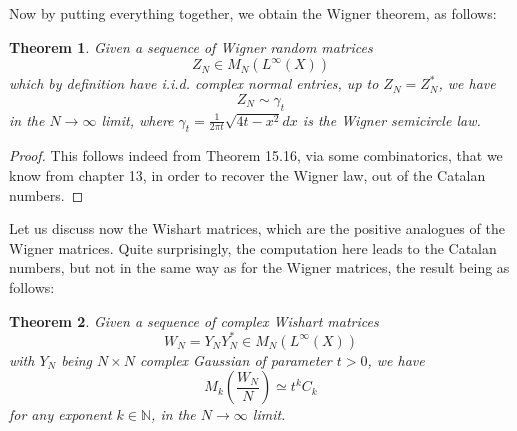 \documentclass[12pt]{amsbook}
\newtheorem{theorem}{Theorem}[chapter]
\begin{document}
Now by putting everything together, we obtain the Wigner theorem, as follows:

\begin{theorem}
Given a sequence of Wigner random matrices
$$Z_N\in M_N(L^\infty(X))$$
which by definition have i.i.d. complex normal entries, up to $Z_N=Z_N^*$, we have
$$Z_N\sim\gamma_t$$
in the $N\to\infty$ limit, where $\gamma_t=\frac{1}{2\pi t}\sqrt{4t-x^2}dx$ is the Wigner semicircle law. 
\end{theorem}

\begin{proof}
This follows indeed from Theorem 15.16, via some combinatorics, that we know from chapter 13, in order to recover the Wigner law, out of the Catalan numbers.
\end{proof}

Let us discuss now the Wishart matrices, which are the positive analogues of the Wigner matrices. Quite surprisingly, the computation here leads to the Catalan numbers, but not in the same way as for the Wigner matrices, the result being as follows:


\begin{theorem}
Given a sequence of complex Wishart matrices
$$W_N=Y_NY_N^*\in M_N(L^\infty(X))$$
with $Y_N$ being $N\times N$ complex Gaussian of parameter $t>0$, we have
$$M_k\left(\frac{W_N}{N}\right)\simeq t^kC_k$$
for any exponent $k\in\mathbb N$, in the $N\to\infty$ limit.
\end{theorem}
\end{document}
